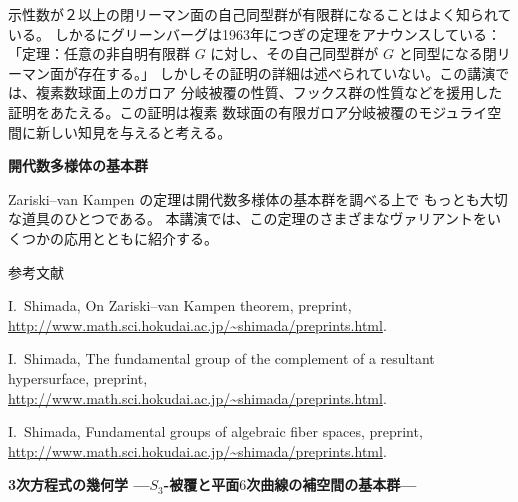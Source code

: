 \documentclass[uplatex,dvipdfmx]{jlreq}
\begin{document}
\bigskip

示性数が２以上の閉リーマン面の自己同型群が有限群になることはよく知られている。
しかるにグリーンバーグは1963年につぎの定理をアナウンスしている：
「定理：任意の非自明有限群 $G$ に対し、その自己同型群が $G$ と同型になる閉リーマン面が存在する。」
しかしその証明の詳細は述べられていない。この講演では、複素数球面上のガロア
分岐被覆の性質、フックス群の性質などを援用した証明をあたえる。この証明は複素
数球面の有限ガロア分岐被覆のモジュライ空間に新しい知見を与えると考える。

\newpage

\begin{center}
{\Large\bfseries 開代数多様体の基本群}

\hspace*{\fill}{\large\bfseries 島田 伊知朗（北大・理）}
\end{center}

\bigskip

Zariski--van Kampen の定理は開代数多様体の基本群を調べる上で
もっとも大切な道具のひとつである。
本講演では、この定理のさまざまなヴァリアントをいくつかの応用とともに紹介する。

\begin{center}\textsc{参考文献}\end{center}

\begin{enumerate}[{[1]}]
  \setlength{\itemsep}{2pt}
  \item[{[1]}] I.~Shimada,
        On Zariski--van Kampen theorem,
        preprint, \url{http://www.math.sci.hokudai.ac.jp/~shimada/preprints.html}.
  \item[{[2]}] I.~Shimada,
        The fundamental group of the complement of a resultant hypersurface,
        preprint, \url{http://www.math.sci.hokudai.ac.jp/~shimada/preprints.html}.
  \item[{[3]}] I.~Shimada,
        Fundamental groups of algebraic fiber spaces,
        preprint, \url{http://www.math.sci.hokudai.ac.jp/~shimada/preprints.html}.
\end{enumerate}

\newpage

\begin{center}
{\Large\bfseries 3次方程式の幾何学 ---$S_3$-被覆と平面$6$次曲線の補空間の基本群---}

\hspace*{\fill}{\large\bfseries 徳永 浩雄（都立大・理）}
\end{center}
\end{document}
